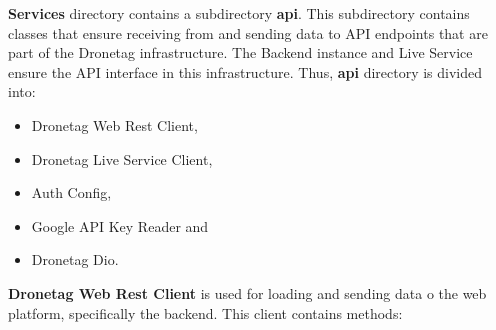 \textbf{Services} directory contains a subdirectory \textbf{api}.
This subdirectory contains classes that ensure receiving from and sending data to API endpoints that are part of the Dronetag infrastructure.
The Backend instance and Live Service ensure the API interface in this infrastructure.
Thus, \textbf{api} directory is divided into:
\begin{itemize}
    \item Dronetag Web Rest Client,
    \item Dronetag Live Service Client,
    \item Auth Config,
    \item Google API Key Reader and
    \item Dronetag Dio.
\end{itemize}
\textbf{Dronetag Web Rest Client} is used for loading and sending data o the web platform, specifically the backend.
This client contains methods:
